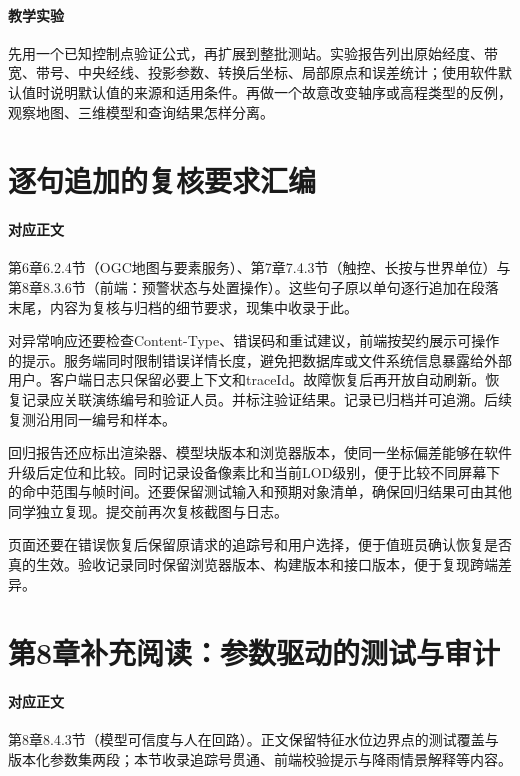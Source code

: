\paragraph{教学实验}先用一个已知控制点验证公式，再扩展到整批测站。实验报告列出原始经度、带宽、带号、中央经线、投影参数、转换后坐标、局部原点和误差统计；使用软件默认值时说明默认值的来源和适用条件。再做一个故意改变轴序或高程类型的反例，观察地图、三维模型和查询结果怎样分离。


\section{逐句追加的复核要求汇编}\label{online:review-notes}

\paragraph{对应正文}第6章6.2.4节（OGC地图与要素服务）、第7章7.4.3节（触控、长按与世界单位）与第8章8.3.6节（前端：预警状态与处置操作）。这些句子原以单句逐行追加在段落末尾，内容为复核与归档的细节要求，现集中收录于此。

对异常响应还要检查Content-Type、错误码和重试建议，前端按契约展示可操作的提示。服务端同时限制错误详情长度，避免把数据库或文件系统信息暴露给外部用户。客户端日志只保留必要上下文和traceId。故障恢复后再开放自动刷新。恢复记录应关联演练编号和验证人员。并标注验证结果。记录已归档并可追溯。后续复测沿用同一编号和样本。

回归报告还应标出渲染器、模型块版本和浏览器版本，使同一坐标偏差能够在软件升级后定位和比较。同时记录设备像素比和当前LOD级别，便于比较不同屏幕下的命中范围与帧时间。还要保留测试输入和预期对象清单，确保回归结果可由其他同学独立复现。提交前再次复核截图与日志。

页面还要在错误恢复后保留原请求的追踪号和用户选择，便于值班员确认恢复是否真的生效。验收记录同时保留浏览器版本、构建版本和接口版本，便于复现跨端差异。

\section{第8章补充阅读：参数驱动的测试与审计}\label{online:ch08-params}

\paragraph{对应正文}第8章8.4.3节（模型可信度与人在回路）。正文保留特征水位边界点的测试覆盖与版本化参数集两段；本节收录追踪号贯通、前端校验提示与降雨情景解释等内容。

